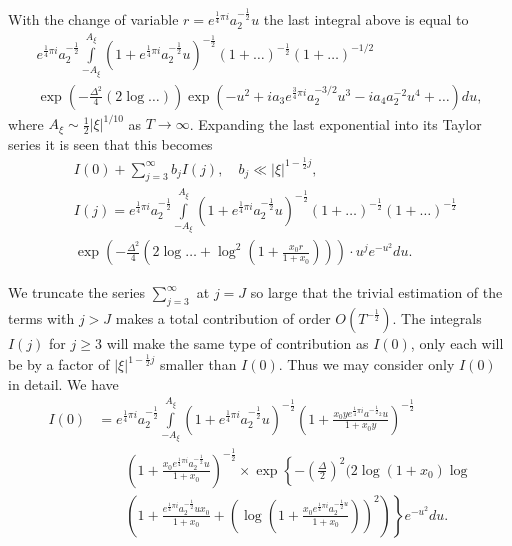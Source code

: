 With the change of variable $r = e^{\frac{1}{4} \pi i}
a^{-\frac{1}{2}}_2 u$ the last integral above is equal to  
\begin{gather*}
e^{\frac{1}{4} \pi i} a^{-\frac{1}{2}}_2 \int\limits^{A_\xi}_{-A_\xi}
\left(1+e^{\frac{1}{4} \pi i} a^{-\frac{1}{2}}_2
u\right)^{-\frac{1}{2}}  (1+ \ldots)^{-\frac{1}{2}}
(1+\ldots)^{-1/2}\\ 
\exp \left(-\frac{\Delta^2}{4} (2\log \ldots) \right) \exp \left(-u^2
+ ia_3 e^{\frac{3}{4} \pi i} a^{-3/2}_2 u^3 - ia_4 a^{-2}_2 u^4+
\ldots \right) du, 
\end{gather*}
where $A_\xi \sim\frac{1}{2} |\xi|^{1/10}$ as $T \to
\infty$. Expanding the last exponential into its Taylor series it is
seen that this becomes 
\begin{align*}
& I (0) + \sum\limits^\infty_{j=3} b_j I (j), \quad b_j \ll
  |\xi|^{1-\frac{1}{2} j},\\ 
& I(j) = e^{\frac{1}{4} \pi i} a^{-\frac{1}{2}}_2
  \int\limits^{A_\xi}_{-A_\xi} \left(1+e^{\frac{1}{4} \pi i}
  a^{-\frac{1}{2}}_2 u\right)^{-\frac{1}{2}} (1+ \ldots)^{-\frac{1}{2}} (1+
  \ldots)^{-\frac{1}{2}} \\ 
& \exp \left( -\frac{\Delta^2}{4} \left(2\log \ldots + \log^2 \left(1+
  \frac{x_0 r}{1+x_0} \right)\right) \right) \cdot u^j e^{-u^2} du. 
\end{align*}

We truncate the series $\sum\limits^\infty_{j=3}$ at $j = J$ so large
that the trivial estimation of the terms with $j > J$ makes a total
contribution of order $O(T^{-\frac{1}{2}})$. The integrals $I(j)$ for
$j \geq 3$ will make the same type of contribution as $I(0)$, only
each will be by a factor of $|\xi|^{1-\frac{1}{2}j}$ smaller than
$I(0)$. Thus we may consider only $I(0)$ in detail. We have  
\begin{align*}
I(0) & = e^{\frac{1}{4} \pi i} a^{-\frac{1}{2}}_2
\int\limits^{A_\xi}_{-A_\xi} \left(1+e^{\frac{1}{4} \pi i}
a^{-\frac{1}{2}}_2 u\right)^{-\frac{1}{2}} \left(1+\frac{x_0
  ye^{\frac{1}{4} \pi i} a^{-\frac{1}{2}_2} u}{1+x_0 y}
\right)^{-\frac{1}{2}}\\ 
& \qquad \left(1+  \frac{x_0 e^{\frac{1}{4} \pi i }a^{-\frac{1}{2}}_2
  u}{1+x_0}\right)^{-\frac{1}{2}} \times 
\exp \left\{ - \left(\frac{\Delta}{2} \right)^2  (2\log (1+x_0) \log
\right. \\ 
& \qquad \left.  \left(1+\frac{e^{\frac{1}{4} \pi i}
  a^{-\frac{1}{2}}_2 ux_0}{1+x_0}  + \left(\log \left(1+\frac{x_0
  e^{\frac{1}{4}\pi i} a^{-\frac{1}{2}u}_2}{1+x_0} \right) \right)^2
\right) \right\}  e^{-u^2} du. 
\end{align*}\pageoriginale

